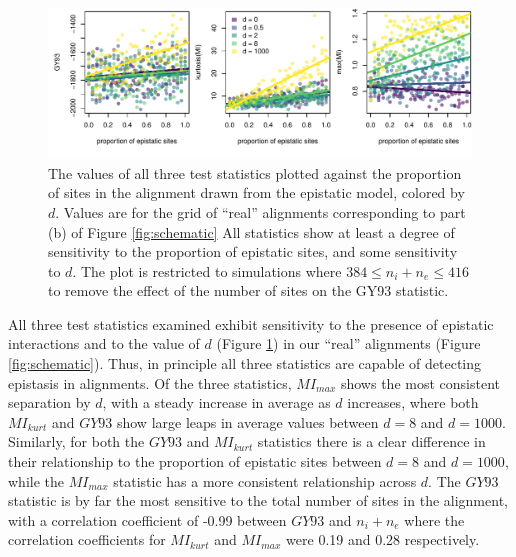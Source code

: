 \documentclass[11pt]{article}
\begin{document}
\begin{figure}
  \centering
  \includegraphics[width=\textwidth]{figures/test_stat_sensitivity.pdf}
  \caption{
  The values of all three test statistics plotted against the proportion of sites in the alignment drawn from the epistatic model, colored by $d$.
  Values are for the grid of ``real'' alignments corresponding to part (b) of Figure \ref{fig:schematic}
  All statistics show at least a degree of sensitivity to the proportion of epistatic sites, and some sensitivity to $d$.
  The plot is restricted to simulations where $384 \leq n_i + n_e \leq 416$ to remove the effect of the number of sites on the GY93 statistic.
  }
  \label{fig:test_stat_sensitivity}
\end{figure}

All three test statistics examined exhibit sensitivity to the presence of epistatic interactions and to the value of $d$ (Figure \ref{fig:test_stat_sensitivity}) in our ``real'' alignments (Figure \ref{fig:schematic}).
Thus, in principle all three statistics are capable of detecting epistasis in alignments.
Of the three statistics, $MI_{max}$ shows the most consistent separation by $d$, with a steady increase in average as $d$ increases, where both $MI_{kurt}$ and $GY93$ show large leaps in average values between $d=8$ and $d=1000$.
Similarly, for both the $GY93$ and $MI_{kurt}$ statistics there is a clear difference in their relationship to the proportion of epistatic sites between $d = 8$ and $d = 1000$, while the $MI_{max}$ statistic has a more consistent relationship across $d$.
The $GY93$ statistic is by far the most sensitive to the total number of sites in the alignment, with a correlation coefficient of -0.99 between $GY93$ and $n_i + n_e$ where the correlation coefficients for $MI_{kurt}$ and $MI_{max}$ were 0.19 and 0.28 respectively.
\end{document}
